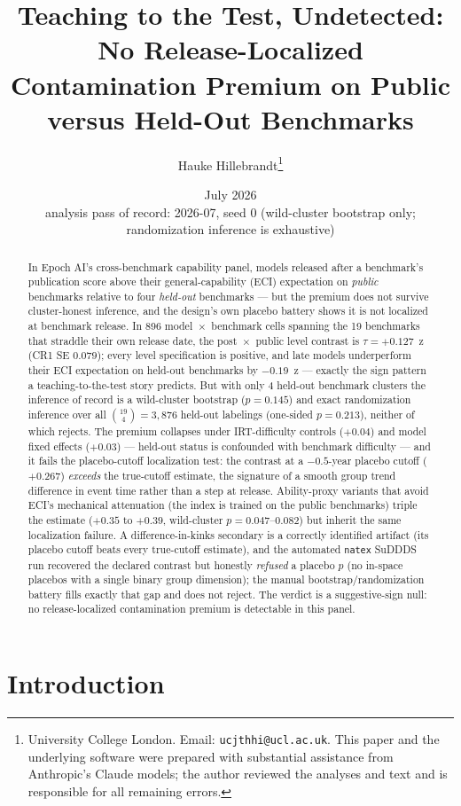 \documentclass[11pt]{article}
\title{Teaching to the Test, Undetected: No Release-Localized Contamination
Premium on Public versus Held-Out Benchmarks}
\author{Hauke Hillebrandt\thanks{University College London. Email:
\texttt{ucjthhi@ucl.ac.uk}. This paper and the underlying \natex{} software were
prepared with substantial assistance from Anthropic's Claude models; the author
reviewed the analyses and text and is responsible for all remaining errors.}}
\date{July 2026 \\ \small analysis pass of record: 2026-07, seed 0 (wild-cluster
bootstrap only; randomization inference is exhaustive)}
\newcommand{\natex}{\texttt{natex}}
\begin{document}
\maketitle

\begin{abstract}
\noindent In Epoch AI's cross-benchmark capability panel, models released
after a benchmark's publication score above their general-capability (ECI)
expectation on \emph{public} benchmarks relative to four \emph{held-out}
benchmarks --- but the premium does not survive cluster-honest inference, and
the design's own placebo battery shows it is not localized at benchmark
release. In 896 model~$\times$~benchmark cells spanning the 19 benchmarks
that straddle their own release date, the post~$\times$~public level contrast
is $\tau=+0.127$~z (CR1 SE $0.079$); every level specification is positive,
and late models underperform their ECI expectation on held-out benchmarks by
$-0.19$~z --- exactly the sign pattern a teaching-to-the-test story predicts.
But with only 4 held-out benchmark clusters the inference of record is a
wild-cluster bootstrap ($p=0.145$) and exact randomization inference over all
$\binom{19}{4}=3{,}876$ held-out labelings (one-sided $p=0.213$), neither of
which rejects. The premium collapses under IRT-difficulty controls ($+0.04$)
and model fixed effects ($+0.03$) --- held-out status is confounded with
benchmark difficulty --- and it fails the placebo-cutoff localization test:
the contrast at a $-0.5$-year placebo cutoff ($+0.267$) \emph{exceeds} the
true-cutoff estimate, the signature of a smooth group trend difference in
event time rather than a step at release. Ability-proxy variants that avoid
ECI's mechanical attenuation (the index is trained on the public benchmarks)
triple the estimate ($+0.35$ to $+0.39$, wild-cluster $p=0.047$--$0.082$) but
inherit the same localization failure. A difference-in-kinks secondary is a
correctly identified artifact (its placebo cutoff beats every true-cutoff
estimate), and the automated \natex{} SuDDDS run recovered the declared
contrast but honestly \emph{refused} a placebo $p$ (no in-space placebos with
a single binary group dimension); the manual bootstrap/randomization battery
fills exactly that gap and does not reject. The verdict is a suggestive-sign
null: no release-localized contamination premium is detectable in this panel.
\end{abstract}

\section{Introduction}\label{sec:intro}
\end{document}
